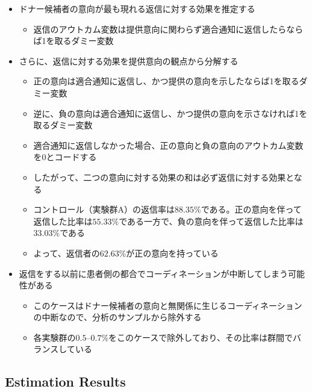 \documentclass[
  a4paperpaper,
]{article}
\providecommand{\tightlist}{%
  \setlength{\itemsep}{0pt}\setlength{\parskip}{0pt}}\usepackage{longtable,booktabs,array}
\begin{document}
\begin{itemize}
\tightlist
\item
  ドナー候補者の意向が最も現れる返信に対する効果を推定する

  \begin{itemize}
  \tightlist
  \item
    返信のアウトカム変数は提供意向に関わらず適合通知に返信したらならば1を取るダミー変数
  \end{itemize}
\item
  さらに、返信に対する効果を提供意向の観点から分解する

  \begin{itemize}
  \tightlist
  \item
    正の意向は適合通知に返信し、かつ提供の意向を示したならば1を取るダミー変数
  \item
    逆に、負の意向は適合通知に返信し、かつ提供の意向を示さなければ1を取るダミー変数
  \item
    適合通知に返信しなかった場合、正の意向と負の意向のアウトカム変数を0とコードする
  \item
    したがって、二つの意向に対する効果の和は必ず返信に対する効果となる
  \item
    コントロール（実験群A）の返信率は\(88.35\)\%である。正の意向を伴って返信した比率は\(55.33\)\%である一方で、負の意向を伴って返信した比率は\(33.03\)\%である
  \item
    よって、返信者の\(62.63\)\%が正の意向を持っている
  \end{itemize}
\item
  返信をする以前に患者側の都合でコーディネーションが中断してしまう可能性がある

  \begin{itemize}
  \tightlist
  \item
    このケースはドナー候補者の意向と無関係に生じるコーディネーションの中断なので、分析のサンプルから除外する
  \item
    各実験群の\(0.5\)--\(0.7\)\%をこのケースで除外しており、その比率は群間でバランスしている
  \end{itemize}
\end{itemize}

\hypertarget{estimation-results}{%
\subsection{Estimation Results}\label{estimation-results}}
\end{document}
